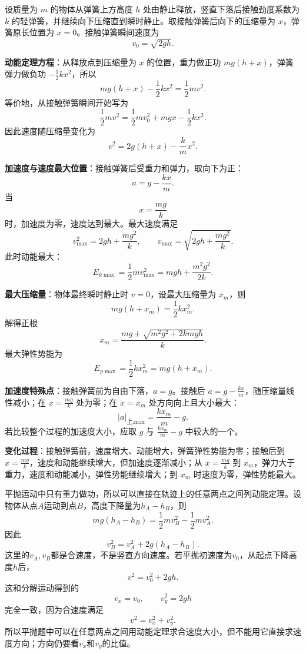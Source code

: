 \begin{casetypebox}[title={\strut\textcolor{white}{\bfseries 常见题型：下落压缩竖直弹簧}}]
设质量为 $m$ 的物体从弹簧上方高度 $h$ 处由静止释放，竖直下落后接触劲度系数为 $k$ 的轻弹簧，并继续向下压缩直到瞬时静止。取接触弹簧后向下的压缩量为 $x$，弹簧原长位置为 $x=0$。接触弹簧瞬间速度为
\[
  v_0=\sqrt{2gh}.
\]

\textbf{动能定理方程}：从释放点到压缩量为 $x$ 的位置，重力做正功 $mg(h+x)$，弹簧弹力做负功 $-\frac12kx^2$，所以
\[
  mg(h+x)-\frac12kx^2=\frac12mv^2.
\]
等价地，从接触弹簧瞬间开始写为
\[
  \frac12mv^2=\frac12mv_0^2+mgx-\frac12kx^2.
\]
因此速度随压缩量变化为
\[
  v^2=2g(h+x)-\frac{k}{m}x^2.
\]

\textbf{加速度与速度最大位置}：接触弹簧后受重力和弹力，取向下为正：
\[
  a=g-\frac{kx}{m}.
\]
当
\[
  x=\frac{mg}{k}
\]
时，加速度为零，速度达到最大。最大速度满足
\[
  v_{\max}^2=2gh+\frac{mg^2}{k},
  \qquad
  v_{\max}=\sqrt{2gh+\frac{mg^2}{k}}.
\]
此时动能最大：
\[
  E_{k\max}=\frac12mv_{\max}^2
  =mgh+\frac{m^2g^2}{2k}.
\]

\textbf{最大压缩量}：物体最终瞬时静止时 $v=0$，设最大压缩量为 $x_m$，则
\[
  mg(h+x_m)=\frac12kx_m^2.
\]
解得正根
\[
  x_m=\frac{mg+\sqrt{m^2g^2+2kmgh}}{k}.
\]
最大弹性势能为
\[
  E_{p\max}=\frac12kx_m^2=mg(h+x_m).
\]

\textbf{加速度特殊点}：接触弹簧前为自由下落，$a=g$。接触后 $a=g-\frac{kx}{m}$，随压缩量线性减小；在 $x=\frac{mg}{k}$ 处为零；在 $x=x_m$ 处方向向上且大小最大：
\[
  |a|_{\text{上,max}}=\frac{kx_m}{m}-g.
\]
若比较整个过程的加速度大小，应取 $g$ 与 $\frac{kx_m}{m}-g$ 中较大的一个。

\textbf{变化过程}：接触弹簧前，速度增大、动能增大，弹簧弹性势能为零；接触后到 $x=\frac{mg}{k}$，速度和动能继续增大，但加速度逐渐减小；从 $x=\frac{mg}{k}$ 到 $x_m$，弹力大于重力，速度和动能减小，弹性势能继续增大；到 $x_m$ 时速度为零，弹性势能最大。\\

\begin{center}
  
\end{center}
\end{casetypebox}

\begin{casetypebox}[title={\strut\textcolor{white}{\bfseries 常见题型：平抛运动中的动能定理}}]
  平抛运动中只有重力做功，所以可以直接在轨迹上的任意两点之间列动能定理。设物体从点$A$运动到点$B$，高度下降量为$h_A-h_B$，则
  \[
    mg(h_A-h_B)=\frac12mv_B^2-\frac12mv_A^2.
  \]
  因此
  \[
    v_B^2=v_A^2+2g(h_A-h_B).
  \]
  这里的$v_A,v_B$都是合速度，不是竖直方向速度。若平抛初速度为$v_0$，从起点下降高度$h$后，
  \[
    v^2=v_0^2+2gh.
  \]
  这和分解运动得到的
  \[
    v_x=v_0,\qquad v_y^2=2gh
  \]
  完全一致，因为合速度满足
  \[
    v^2=v_x^2+v_y^2.
  \]
  所以平抛题中可以在任意两点之间用动能定理求合速度大小，但不能用它直接求速度方向；方向仍要看$v_x$和$v_y$的比值。
\end{casetypebox}


